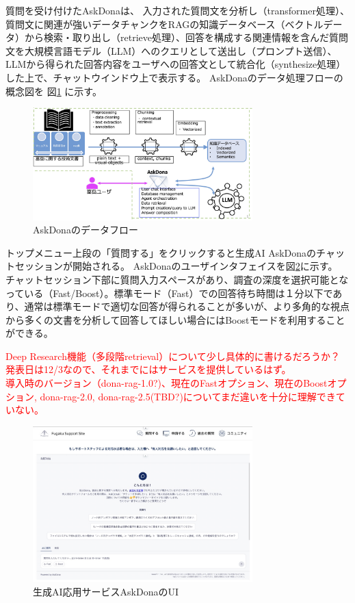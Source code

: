 \documentclass{jsaxiesproc}
\begin{document}
質問を受け付けたAskDonaは、
入力された質問文を分析し（transformer処理）、質問文に関連が強いデータチャンクをRAGの知識データベース（ベクトルデータ）から検索・取り出し（retrieve処理）、回答を構成する関連情報を含んだ質問文を大規模言語モデル（LLM）へのクエリとして送出し（プロンプト送信）、LLMから得られた回答内容をユーザへの回答文として統合化（synthesize処理）した上で、チャットウインドウ上で表示する。
AskDonaのデータ処理フローの概念図を
図\ref{fig:AskDona-Dataflow-J.jpg}
に示す。

\begin{figure}[htbp]
\includegraphics[width=8.5cm]{figs/AskDona-Dataflow-J.jpg}
\caption{AskDonaのデータフロー}
\label{fig:AskDona-Dataflow-J.jpg}
\end{figure}


トップメニュー上段の「質問する」をクリックすると生成AI AskDonaのチャットセッションが開始される。
AskDonaのユーザインタフェイスを図\ref{fig:AskDona-Chat-1.jpg}に示す。
チャットセッション下部に質問入力スペースがあり、調査の深度を選択可能となっている（Fast/Boost）。標準モード（Fast）での回答待ち時間は１分以下であり、通常は標準モードで適切な回答が得られることが多いが、より多角的な視点から多くの文書を分析して回答してほしい場合にはBoostモードを利用することができる。


\textcolor{red}{
Deep Research機能（多段階retrieval）について少し具体的に書けるだろうか？
発表日は12/3なので、それまでにはサービスを提供しているはず。\\
導入時のバージョン（dona-rag-1.0?)、現在のFastオプション、現在のBoostオプション, dona-rag-2.0, dona-rag-2.5(TBD?)についてまだ違いを十分に理解できていない。
}


\begin{figure}[htbp]
\includegraphics[width=8.5cm]{figs/AskDona-Chat-1.jpg}
\caption{生成AI応用サービスAskDonaのUI}
\label{fig:AskDona-Chat-1.jpg}
\end{figure}
\end{document}
